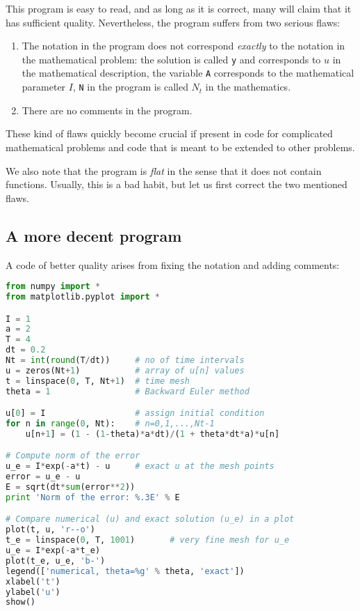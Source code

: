 \documentclass[graybox,sectrefs,envcountresetchap,open=right,final]{svmonodo}
\begin{document}
This program is easy to read, and as long as it is correct, many will
claim that it has sufficient quality. Nevertheless, the program suffers
from two serious flaws:

\begin{enumerate}
\item The notation in the program does not correspond \emph{exactly} to
   the notation in the mathematical problem: the solution is called
   \texttt{y} and corresponds to $u$ in the mathematical description,
   the variable \texttt{A} corresponds to the mathematical parameter $I$,
   \texttt{N} in the program is called $N_t$ in the mathematics.

\item There are no comments in the program.
\end{enumerate}

\noindent
These kind of flaws quickly become crucial if present in code for complicated
mathematical problems and code that is meant to be extended to other problems.

We also note that the program is \emph{flat} in the sense that it does
not contain functions. Usually, this is a bad habit, but let us
first correct the two mentioned flaws.

\subsection{A more decent program}
\label{softeng1:basic:impl2}

A code of better quality arises from
fixing the notation and adding comments:

\begin{lstlisting}[language=Python,style=blue1bar_bluegreen]
from numpy import *
from matplotlib.pyplot import *

I = 1
a = 2
T = 4
dt = 0.2
Nt = int(round(T/dt))     # no of time intervals
u = zeros(Nt+1)           # array of u[n] values
t = linspace(0, T, Nt+1)  # time mesh
theta = 1                 # Backward Euler method

u[0] = I                  # assign initial condition
for n in range(0, Nt):    # n=0,1,...,Nt-1
    u[n+1] = (1 - (1-theta)*a*dt)/(1 + theta*dt*a)*u[n]

# Compute norm of the error
u_e = I*exp(-a*t) - u     # exact u at the mesh points
error = u_e - u
E = sqrt(dt*sum(error**2))
print 'Norm of the error: %.3E' % E

# Compare numerical (u) and exact solution (u_e) in a plot
plot(t, u, 'r--o')
t_e = linspace(0, T, 1001)       # very fine mesh for u_e
u_e = I*exp(-a*t_e)
plot(t_e, u_e, 'b-')
legend(['numerical, theta=%g' % theta, 'exact'])
xlabel('t')
ylabel('u')
show()
\end{lstlisting}
\end{document}

